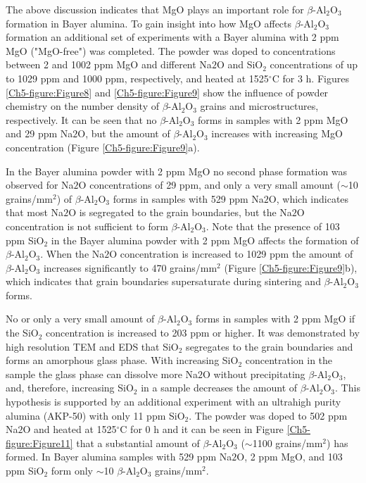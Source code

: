 The above discussion indicates that MgO plays an important role for $\beta$-Al$_{2}$O$_{3}$ formation in Bayer alumina. To gain insight into how MgO affects $\beta$-Al$_{2}$O$_{3}$ formation an additional set of experiments with a Bayer alumina with 2 ppm MgO ("MgO-free") was completed. The powder was doped to concentrations between 2 and 1002 ppm MgO and different Na${2}$O and SiO$_{2}$ concentrations of up to 1029 ppm and 1000 ppm, respectively, and heated at 1525$^{\circ}$C for 3 h. Figures \ref{Ch5-figure:Figure8} and \ref{Ch5-figure:Figure9} show the influence of powder chemistry on the number density of $\beta$-Al$_{2}$O$_{3}$ grains and microstructures, respectively. It can be seen that no $\beta$-Al$_{2}$O$_{3}$ forms in samples with 2 ppm MgO and 29 ppm Na${2}$O, but the amount of $\beta$-Al$_{2}$O$_{3}$ increases with increasing MgO concentration (Figure \ref{Ch5-figure:Figure9}a). 

In the Bayer alumina powder with 2 ppm MgO no second phase formation was observed for Na${2}$O concentrations of 29 ppm, and only a very small amount ($\sim$10 grains/mm$^{2}$) of $\beta$-Al$_{2}$O$_{3}$ forms in samples with 529 ppm Na${2}$O, which indicates that most Na${2}$O is segregated to the grain boundaries, but the Na${2}$O concentration is not sufficient to form $\beta$-Al$_{2}$O$_{3}$. Note that the presence of 103 ppm SiO$_{2}$ in the Bayer alumina powder with 2 ppm MgO affects the formation of $\beta$-Al$_{2}$O$_{3}$. When the Na${2}$O concentration is increased to 1029 ppm the amount of $\beta$-Al$_{2}$O$_{3}$ increases significantly to 470 grains/mm$^{2}$ (Figure \ref{Ch5-figure:Figure9}b), which indicates that grain boundaries supersaturate during sintering and $\beta$-Al$_{2}$O$_{3}$ forms. 

No or only a very small amount of $\beta$-Al$_{2}$O$_{3}$ forms in samples with 2 ppm MgO if the SiO$_{2}$ concentration is increased to 203 ppm or higher. It was demonstrated by high resolution TEM and EDS that SiO$_{2}$ segregates to the grain boundaries and forms an amorphous glass phase. With increasing SiO$_{2}$ concentration in the sample the glass phase can dissolve more Na${2}$O without precipitating $\beta$-Al$_{2}$O$_{3}$, and, therefore, increasing SiO$_{2}$ in a sample decreases the amount of $\beta$-Al$_{2}$O$_{3}$. This hypothesis is supported by an additional experiment with an ultrahigh purity alumina (AKP-50) with only 11 ppm SiO$_{2}$. The powder was doped to 502 ppm Na${2}$O and heated at 1525$^{\circ}$C for 0 h and it can be seen in Figure \ref{Ch5-figure:Figure11} that a substantial amount of $\beta$-Al$_{2}$O$_{3}$ ($\sim$1100 grains/mm$^{2}$) has formed. In Bayer alumina samples with 529 ppm Na${2}$O, 2 ppm MgO, and 103 ppm SiO$_{2}$ form only $\sim$10 $\beta$-Al$_{2}$O$_{3}$ grains/mm$^{2}$. 

